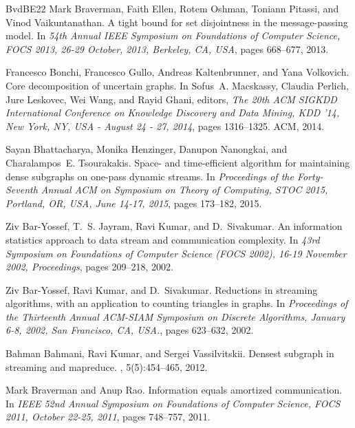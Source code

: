 \documentclass[11pt,letterpaper]{article}
\theoremstyle{definition}
\begin{document}
\begin{thebibliography}{BvdBE{\etalchar{+}}22}
Mark Braverman, Faith Ellen, Rotem Oshman, Toniann Pitassi, and Vinod Vaikuntanathan.
\newblock A tight bound for set disjointness in the message-passing model.
\newblock In {\em 54th Annual {IEEE} Symposium on Foundations of Computer Science, {FOCS} 2013, 26-29 October, 2013, Berkeley, CA, {USA}}, pages 668--677, 2013.

Francesco Bonchi, Francesco Gullo, Andreas Kaltenbrunner, and Yana Volkovich.
\newblock Core decomposition of uncertain graphs.
\newblock In Sofus~A. Macskassy, Claudia Perlich, Jure Leskovec, Wei Wang, and Rayid Ghani, editors, {\em The 20th {ACM} {SIGKDD} International Conference on Knowledge Discovery and Data Mining, {KDD} '14, New York, NY, {USA} - August 24 - 27, 2014}, pages 1316--1325. {ACM}, 2014.

Sayan Bhattacharya, Monika Henzinger, Danupon Nanongkai, and Charalampos~E. Tsourakakis.
\newblock Space- and time-efficient algorithm for maintaining dense subgraphs on one-pass dynamic streams.
\newblock In {\em Proceedings of the Forty-Seventh Annual {ACM} on Symposium on Theory of Computing, {STOC} 2015, Portland, OR, USA, June 14-17, 2015}, pages 173--182, 2015.

Ziv Bar{-}Yossef, T.~S. Jayram, Ravi Kumar, and D.~Sivakumar.
\newblock An information statistics approach to data stream and communication complexity.
\newblock In {\em 43rd Symposium on Foundations of Computer Science {(FOCS} 2002), 16-19 November 2002, Proceedings}, pages 209--218, 2002.

Ziv Bar{-}Yossef, Ravi Kumar, and D.~Sivakumar.
\newblock Reductions in streaming algorithms, with an application to counting triangles in graphs.
\newblock In {\em Proceedings of the Thirteenth Annual {ACM-SIAM} Symposium on Discrete Algorithms, January 6-8, 2002, San Francisco, CA, {USA.}}, pages 623--632, 2002.

Bahman Bahmani, Ravi Kumar, and Sergei Vassilvitskii.
\newblock Densest subgraph in streaming and mapreduce.
, 5(5):454--465, 2012.

Mark Braverman and Anup Rao.
\newblock Information equals amortized communication.
\newblock In {\em {IEEE} 52nd Annual Symposium on Foundations of Computer Science, {FOCS} 2011, October 22-25, 2011}, pages 748--757, 2011.


\end{thebibliography}
\end{document}
